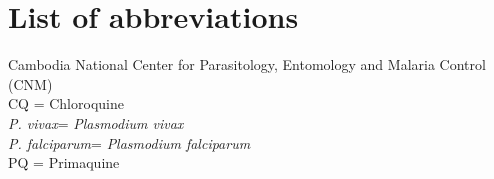 \documentclass[doublespacing]{bmcart}
\newcommand{\pv}{\textit{P. vivax}}
\newcommand{\pf}{\textit{P. falciparum}}
\begin{document}
\section*{List of abbreviations}
Cambodia National Center for Parasitology, Entomology and Malaria Control (CNM)\\
CQ = Chloroquine \\
\pv = \textit{Plasmodium vivax} \\
\pf = \textit{Plasmodium falciparum} \\
PQ = Primaquine \\


\end{document}
